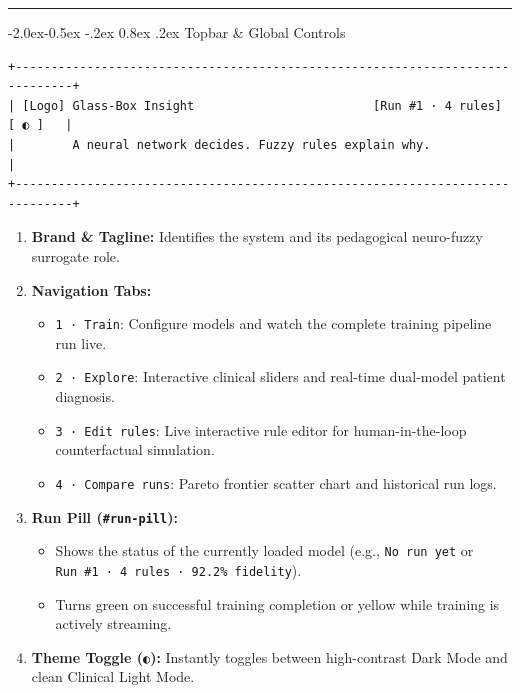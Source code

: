 \documentclass[10pt,a4paper]{article}
\makeatletter
\renewcommand\subsubsection{\@startsection{subsubsection}{3}{\z@}%
                                     {-2.0ex\@plus -0.5ex \@minus -.2ex}%
                                     {0.8ex \@plus .2ex}%
                                     {\normalfont\normalsize\bfseries\color{accent}}}
\providecommand{\tightlist}{\setlength{\itemsep}{1pt}\setlength{\parskip}{1pt}}
\makeatother
\begin{document}
\begin{center}\rule{0.5\linewidth}{0.5pt}\end{center}

\subsubsection{Topbar \& Global Controls}\label{topbar-global-controls}

\begin{verbatim}
+------------------------------------------------------------------------------+
| [Logo] Glass-Box Insight                         [Run #1 · 4 rules]  [ ◐ ]   |
|        A neural network decides. Fuzzy rules explain why.                    |
+------------------------------------------------------------------------------+
\end{verbatim}

\begin{enumerate}
\def\labelenumi{\arabic{enumi}.}
\tightlist
\item
  \textbf{Brand \& Tagline:} Identifies the system and its pedagogical
  neuro-fuzzy surrogate role.
\item
  \textbf{Navigation Tabs:}

  \begin{itemize}
  \tightlist
  \item
    \texttt{1\ ·\ Train}: Configure models and watch the complete
    training pipeline run live.
  \item
    \texttt{2\ ·\ Explore}: Interactive clinical sliders and real-time
    dual-model patient diagnosis.
  \item
    \texttt{3\ ·\ Edit\ rules}: Live interactive rule editor for
    human-in-the-loop counterfactual simulation.
  \item
    \texttt{4\ ·\ Compare\ runs}: Pareto frontier scatter chart and
    historical run logs.
  \end{itemize}
\item
  \textbf{Run Pill (\texttt{\#run-pill}):}

  \begin{itemize}
  \tightlist
  \item
    Shows the status of the currently loaded model (e.g.,
    \texttt{No\ run\ yet} or
    \texttt{Run\ \#1\ ·\ 4\ rules\ ·\ 92.2\%\ fidelity}).
  \item
    Turns green on successful training completion or yellow while
    training is actively streaming.
  \end{itemize}
\item
  \textbf{Theme Toggle (\texttt{◐}):} Instantly toggles between
  high-contrast Dark Mode and clean Clinical Light Mode.
\end{enumerate}
\end{document}
